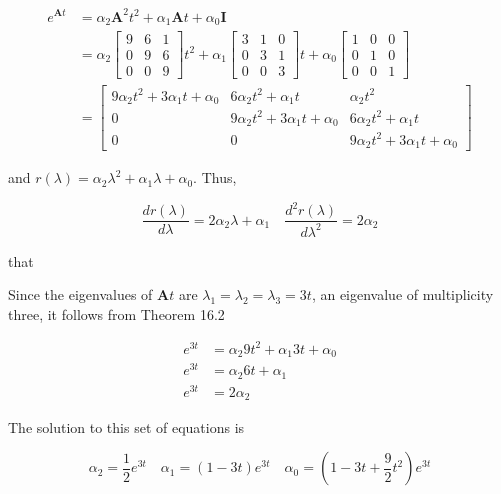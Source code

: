 \documentclass[10pt]{article}
\begin{document}
\begin{align*}
e^{\mathbf{A} t} & =\alpha_{2} \mathbf{A}^{2} t^{2}+\alpha_{1} \mathbf{A} t+\alpha_{0} \mathbf{I} \\
& =\alpha_{2}\left[\begin{array}{lll}
9 & 6 & 1 \\
0 & 9 & 6 \\
0 & 0 & 9
\end{array}\right] t^{2}+\alpha_{1}\left[\begin{array}{lll}
3 & 1 & 0 \\
0 & 3 & 1 \\
0 & 0 & 3
\end{array}\right] t+\alpha_{0}\left[\begin{array}{ccc}
1 & 0 & 0 \\
0 & 1 & 0 \\
0 & 0 & 1
\end{array}\right] \\
& =\left[\begin{array}{ccc}
9 \alpha_{2} t^{2}+3 \alpha_{1} t+\alpha_{0} & 6 \alpha_{2} t^{2}+\alpha_{1} t & \alpha_{2} t^{2} \\
0 & 9 \alpha_{2} t^{2}+3 \alpha_{1} t+\alpha_{0} & 6 \alpha_{2} t^{2}+\alpha_{1} t \\
0 & 0 & 9 \alpha_{2} t^{2}+3 \alpha_{1} t+\alpha_{0}
\end{array}\right] \tag{1}
\end{align*}


and $r(\lambda)=\alpha_{2} \lambda^{2}+\alpha_{1} \lambda+\alpha_{0}$. Thus,

$$
\frac{d r(\lambda)}{d \lambda}=2 \alpha_{2} \lambda+\alpha_{1} \quad \frac{d^{2} r(\lambda)}{d \lambda^{2}}=2 \alpha_{2}
$$

that

Since the eigenvalues of $\mathbf{A} t$ are $\lambda_{1}=\lambda_{2}=\lambda_{3}=3 t$, an eigenvalue of multiplicity three, it follows from Theorem 16.2

$$
\begin{aligned}
e^{3 t} & =\alpha_{2} 9 t^{2}+\alpha_{1} 3 t+\alpha_{0} \\
e^{3 t} & =\alpha_{2} 6 t+\alpha_{1} \\
e^{3 t} & =2 \alpha_{2}
\end{aligned}
$$

The solution to this set of equations is

$$
\alpha_{2}=\frac{1}{2} e^{3 t} \quad \alpha_{1}=(1-3 t) e^{3 t} \quad \alpha_{0}=\left(1-3 t+\frac{9}{2} t^{2}\right) e^{3 t}
$$
\end{document}
